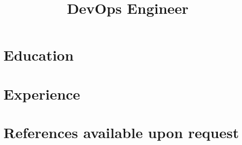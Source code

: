 \documentclass[11pt,a4paper,sans]{moderncv}
\title{DevOps Engineer}
\begin{document}

\section{Education}

\section{Experience}

\section{References available upon request}
\end{document}
